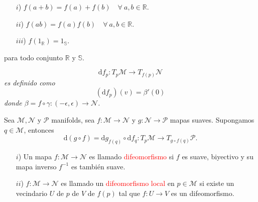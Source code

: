 \documentclass[../main]{subfiles}
\begin{document}
\begin{adjustwidth}{0pt}{-100pt}

\begin{enumerate}
    \item[$i$)] $f(a+b)=f(a)+f(b) \quad \forall \ a,b \in \mathbb{R}$.
    \item[$ii$)] $f(ab)=f(a)f(b)\quad \forall \ a,b \in \mathbb{R}$.
    \item[$iii$)] $f(1_{\mathbb{R}})=1_{\mathbb{S}}$.  
\end{enumerate}
para todo conjunto $\mathbb{R}$ y $\mathbb{S}$.

\begin{equation}
    \mathrm{d}f_p: T_p\mathcal{M}\rightarrow T_{f(p)}\mathcal{N}
\end{equation}
\textit{es definido como} 
\begin{equation}
    (\mathrm{d}f_p)(v)=\beta'(0)
\end{equation}
\textit{donde $\beta=f \circ \gamma:(-\epsilon, \epsilon)\rightarrow \mathcal{N}$.}

\proposicion{} Sea $\mathcal{M}, \mathcal{N}$ y $\mathcal{P}$ manifolds, sea $f: \mathcal{M}\rightarrow \mathcal{N}$ y $g:\mathcal{N}\rightarrow \mathcal{P}$ mapas suaves. Supongamos $q\in \mathcal{M}$, entonces 
\begin{equation}
    \mathrm{d}(g\circ f)=\mathrm{d}g_{f(q)}\circ \mathrm{d}f_q: T_p \mathcal{M}\rightarrow T_{g \circ f(q)} \mathcal{P}.
\end{equation}


\begin{enumerate}
    \item[$i$)] Un mapa $f: \mathcal{M}\rightarrow \mathcal{N}$ es llamado \textcolor{red}{difeomorfismo} si $f$ es suave, biyectivo y su mapa inverso $f^{-1}$ es también suave.
    \item[$ii$)] $f: \mathcal{M}\rightarrow \mathcal{N}$ es llamado un \textcolor{red}{difeomorfismo local} en $p \in \mathcal{M}$ si existe un vecindario $U$ de $p$ de $V$ de $f(p)$ tal que $f: U\rightarrow V$ es un difeomorfismo.  
\end{enumerate}


\end{adjustwidth}
\end{document}
